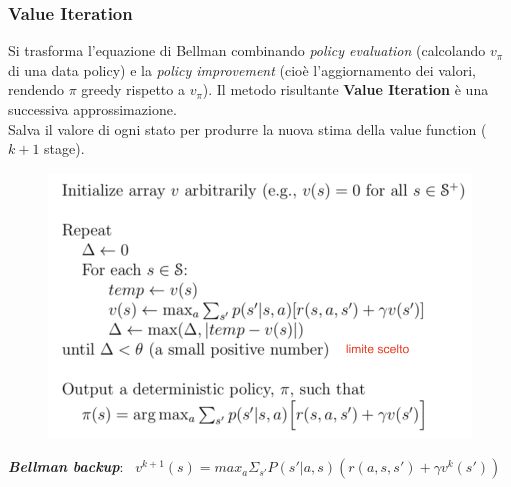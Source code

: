 \documentclass[a4paper, notitlepage, 9pt]{extreport}
\begin{document}
\subsubsection*{Value Iteration}
\begin{multicols}{2}
	\noindent
	Si trasforma l'equazione di Bellman combinando \textit{policy evaluation} (calcolando $v_\pi$ di una data policy) e la \textit{policy improvement} (cioè l'aggiornamento dei valori, rendendo $\pi$ greedy rispetto a $v_\pi$). Il metodo risultante \textbf{Value Iteration} è una successiva approssimazione.\\
	Salva il valore di ogni stato per produrre la nuova stima della value function ($k+1$ stage).
	\columnbreak
	\begin{figure}[H]
		\centering
		\includegraphics[scale=0.33]{VI}
	\end{figure}
\end{multicols}
\noindent
\textit{\textbf{Bellman backup}}: ~$v^{k+1}(s) = max_a \Sigma_{s'} P(s' | a, s) (r(a, s, s') + \gamma v^k(s'))$
\end{document}
